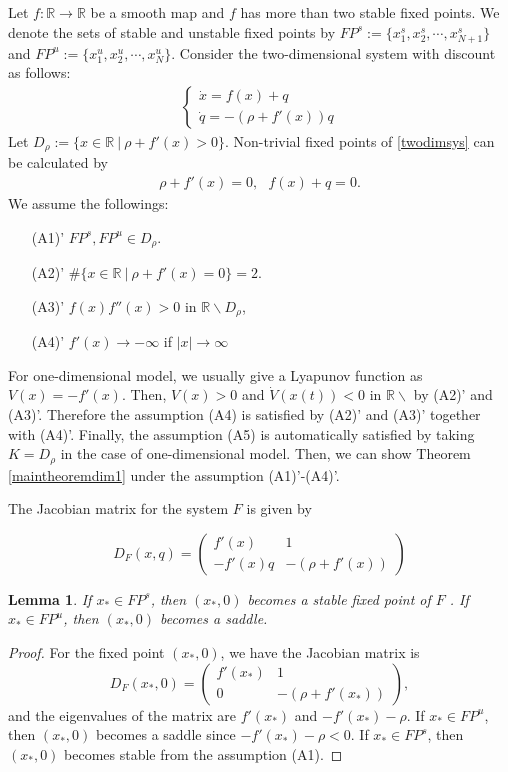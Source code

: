 \documentclass[11pt,reqno]{amsart}
\newtheorem{lemma}[theorem]{Lemma}
\begin{document}
Let $f:\mathbb{R}\to\mathbb{R}$ be a smooth map and $f$ has more than two stable fixed points. We denote the sets of stable and unstable fixed points by $FP^s:=\{x_1^s,x_2^s,\cdots,x_{N+1}^s\}$ and $FP^u:=\{x_1^u,x_2^u,\cdots,x_{N}^u\}$. Consider the two-dimensional system with discount as follows:
\begin{eqnarray}\label{twodimsys}
\begin{cases}
\dot{x}=f(x)+q\\
\dot{q}=-(\rho + f'(x))q
\end{cases}
\end{eqnarray}
Let $D_\rho:=\{x\in\mathbb{R}\ |\ \rho+f'(x)>0\}$. Non-trivial fixed points of \eqref{twodimsys} can be calculated by
\begin{eqnarray}\label{ntfpdim1}
\rho +f'(x)=0,\ \ \  f(x)+q=0.
\end{eqnarray}
We assume the followings:
\begin{itemize}
\item[(A1)'] $FP^s, FP^u\in D_\rho$.
\item[(A2)'] $\#\{x\in\mathbb{R}\ |\ \rho +f'(x)=0\}=2$.
\item[(A3)'] $f(x)f''(x) > 0$ in $\mathbb{R}\backslash D_\rho$,
\item[(A4)'] $f'(x)\to-\infty$ if $|x|\to \infty$ 
\end{itemize}
For one-dimensional model, we usually give a Lyapunov function as $V(x)=-f'(x)$. Then, $V(x) > 0$ and $\dot{V}(x(t))<0$ in $\mathbb{R}\backslash$ by (A2)' and (A3)'. Therefore the assumption (A4) is satisfied by (A2)' and (A3)' together with (A4)'. Finally, the assumption (A5) is automatically satisfied by taking $K=D_\rho$ in the case of one-dimensional model. Then, we can show Theorem \ref{maintheoremdim1} under the assumption (A1)'-(A4)'.
 


The Jacobian matrix for the system $F$ is given by

$$
D_F(x,q)=\begin{pmatrix}
f'(x) & 1 \\
-f'(x)q & -(\rho+f'(x))
\end{pmatrix}
$$

 
\begin{lemma}
If $x_*\in FP^s$, then $(x_*,0)$ becomes a stable fixed point of $F$ . If $x_*\in FP^u$, then $(x_*,0)$ becomes a saddle. 
\end{lemma}

\begin{proof}
For the fixed point $(x_*,0)$, we have the Jacobian matrix is
$$
D_F(x_*,0)=\begin{pmatrix}
f'(x_*) & 1 \\
0 & -(\rho+f'(x_*))
\end{pmatrix},
$$
and the eigenvalues of the matrix are $f'(x_*)$ and $-f'(x_*)-\rho$. If $x_*\in FP^u$, then $(x_*,0)$ becomes a saddle since $-f'(x_*)-\rho<0$. If $x_*\in FP^s$, then $(x_*,0)$ becomes stable from the assumption (A1).

\end{proof}
\end{document}
